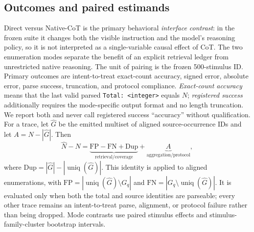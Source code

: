\documentclass[10pt,twocolumn]{article}
\newcommand{\uniq}{\operatorname{uniq}}
\begin{document}
\subsection{Outcomes and paired estimands}
Direct versus Native-CoT is the primary behavioral \emph{interface contrast}: in the frozen
suite it changes both the visible instruction and the model's reasoning policy, so it is not
interpreted as a single-variable causal effect of CoT. The two enumeration modes
separate the benefit of an explicit retrieval ledger from unrestricted native reasoning. The
  unit of pairing is the frozen 500-stimulus ID. Primary outcomes are intent-to-treat
  exact-count accuracy, signed error, absolute error, parse success, truncation, and protocol
  compliance. \emph{Exact-count accuracy} means that the last valid parsed
  \texttt{Total: <integer>} equals $N$; \emph{registered success} additionally requires the
  mode-specific output format and no length truncation. We report both and never call registered
  success ``accuracy'' without qualification.
For a trace, let $\widehat G$ be the emitted multiset of aligned source-occurrence IDs and let
$A=\widehat N-|\widehat G|$. Then
\begin{equation}
 \widehat N-N
 =\underbrace{\mathrm{FP}-\mathrm{FN}+\mathrm{Dup}}_{\text{retrieval/coverage}}
 +\underbrace{A}_{\text{aggregation/protocol}},
 \label{eq:error-budget}
\end{equation}
where $\mathrm{Dup}=|\widehat G|-|\uniq(\widehat G)|$. This identity is applied to aligned
enumerations, with
$\mathrm{FP}=|\uniq(\widehat G)\setminus G_q|$ and
$\mathrm{FN}=|G_q\setminus\uniq(\widehat G)|$. It is evaluated only when both the total and
source identities are parseable; every other trace remains an intent-to-treat parse, alignment,
or protocol failure rather than being dropped.
Mode contrasts use paired stimulus effects and stimulus-family-cluster bootstrap intervals.
\end{document}
